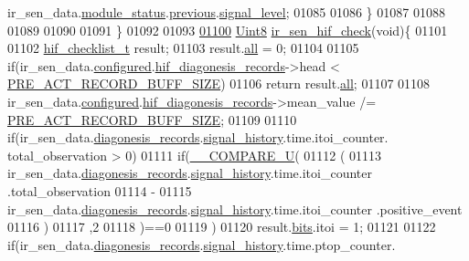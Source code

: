 \begin{DoxyCode}
{{      ir\_sen\_data.\hyperlink{a00023_a5a53c391562b059eb744ac679f3765ca}{module\_status}.\hyperlink{a00017_a0fc6d9ce6203a17f672c19d3d8747aee}{previous}.\hyperlink{a00017_abcdf2bc0c2e5a14863938ae28c3bc96e}{signal\_level};
01085 
01086          \}
01087 
01088 
01089 
01090 
01091  \}
01092 
01093 
\hypertarget{a00045_source_l01100}{}\hyperlink{a00045_a86870a0e00601a92277e689447739ce9}{01100} \hyperlink{a00072_af84840501dec18061d18a68c162a8fa2}{Uint8} \hyperlink{a00045_a86870a0e00601a92277e689447739ce9}{ir\_sen\_hif\_check}(\textcolor{keywordtype}{void})\{
01101 
01102     \hyperlink{a00021_d7/d9f/a00454}{hif\_checklist\_t} result;
01103     result.\hyperlink{a00021_a2625a533c46821f49caaf4dcc77316b1}{all} = 0;
01104 
01105     \textcolor{keywordflow}{if}(ir\_sen\_data.\hyperlink{a00023_a94b2d1f6ea4ab334c74d24984dd27843}{configured}.\hyperlink{a00021_ae18294f7499d9fcb5ec796a1816b8cd8}{hif\_diagonesis\_records}->head < 
      \hyperlink{a00022_a18dcecc16ded13fa622e0913e73442e6}{PRE\_ACT\_RECORD\_BUFF\_SIZE})
01106         \textcolor{keywordflow}{return} result.\hyperlink{a00021_a2625a533c46821f49caaf4dcc77316b1}{all};
01107 
01108     ir\_sen\_data.\hyperlink{a00023_a94b2d1f6ea4ab334c74d24984dd27843}{configured}.\hyperlink{a00021_ae18294f7499d9fcb5ec796a1816b8cd8}{hif\_diagonesis\_records}->mean\_value /=
      \hyperlink{a00022_a18dcecc16ded13fa622e0913e73442e6}{PRE\_ACT\_RECORD\_BUFF\_SIZE};
01109 
01110     \textcolor{keywordflow}{if}(ir\_sen\_data.\hyperlink{a00023_a7ae905b560513ad201e58c2f63375030}{diagonesis\_records}.\hyperlink{a00017_affb63906d23cb1cb7787d61eaaedfb60}{signal\_history}.time.itoi\_counter.
      total\_observation > 0)
01111     \textcolor{keywordflow}{if}(\hyperlink{a00021_a2ec57e7d50ba444ecb9e5c8b717d832d}{\_\_COMPARE\_U}(
01112             (
01113             ir\_sen\_data.\hyperlink{a00023_a7ae905b560513ad201e58c2f63375030}{diagonesis\_records}.\hyperlink{a00017_affb63906d23cb1cb7787d61eaaedfb60}{signal\_history}.time.itoi\_counter
      .total\_observation
01114             -
01115             ir\_sen\_data.\hyperlink{a00023_a7ae905b560513ad201e58c2f63375030}{diagonesis\_records}.\hyperlink{a00017_affb63906d23cb1cb7787d61eaaedfb60}{signal\_history}.time.itoi\_counter
      .positive\_event
01116             )
01117             ,2
01118             )==0
01119            )
01120         result.\hyperlink{a00021_a4c757443cba2deaf7051fd53f385a73e}{bits}.itoi = 1;
01121 
01122     \textcolor{keywordflow}{if}(ir\_sen\_data.\hyperlink{a00023_a7ae905b560513ad201e58c2f63375030}{diagonesis\_records}.\hyperlink{a00017_affb63906d23cb1cb7787d61eaaedfb60}{signal\_history}.time.ptop\_counter.
}}
\end{DoxyCode}
